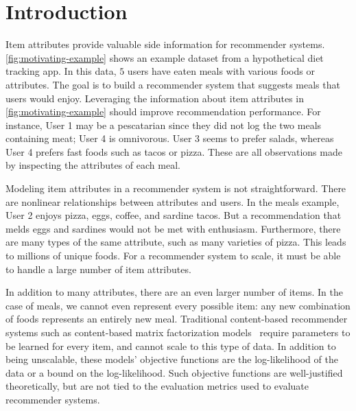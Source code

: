 \section{Introduction}
\label{sec:introduction}
Item attributes provide valuable side information for recommender systems.
\cref{fig:motivating-example} shows an example dataset from a hypothetical diet
tracking app. In this data, $5$ users have eaten meals with various foods or
attributes. The goal is to build a recommender system that suggests meals that
users would enjoy. Leveraging the information about item attributes in
\cref{fig:motivating-example} should improve recommendation performance. For
instance, User 1 may be a pescatarian since they did not log the two meals
containing meat; User 4 is omnivorous. User 3 seems to prefer salads, whereas
User 4 prefers fast foods such as tacos or pizza. These are all observations
made by inspecting the attributes of each meal.



Modeling item attributes in a recommender system is not straightforward. There
are nonlinear relationships between attributes and users. In the meals example,
User 2 enjoys pizza, eggs, coffee, and sardine tacos. But a recommendation that
melds eggs and sardines would not be met with enthusiasm. Furthermore, there are
many types of the same attribute, such as many varieties of pizza. This leads to
millions of unique foods. For a recommender system to scale, it must be able to
handle a large number of item attributes.

In addition to many attributes, there are an even larger number of items. In the
case of meals, we cannot even represent every possible item: any new combination
of foods represents an entirely new meal. Traditional content-based recommender
systems such as content-based matrix factorization
models~\cite{wang2011collaborative,gopalan2014content-based} require parameters
to be learned for every item, and cannot scale to this type of data. In addition
to being unscalable, these models' objective functions are the log-likelihood of
the data or a bound on the log-likelihood. Such objective functions are
well-justified theoretically, but are not tied to the evaluation metrics used to
evaluate recommender systems.


